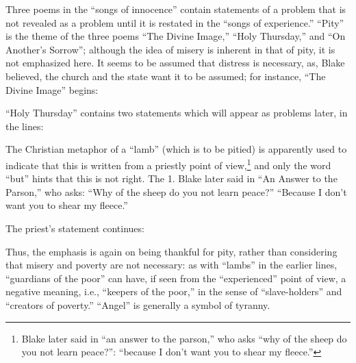 Three poems in the \enquote{songs of innocence} contain statements of a problem that is not revealed as a problem until
it is restated in the \enquote{songs of experience.} \enquote{Pity} is the theme of the three poems \enquote{The Divine Image,} \enquote{Holy Thursday,} and
\enquote{On Another's Sorrow}; although the idea of misery is inherent in that of pity, it is not emphasized here. It seems to be assumed that
distress is necessary, as, Blake believed, the church and the state want it to be assumed; for instance, \enquote{The Divine Image} begins:


\enquote{Holy Thursday} contains two statements which will appear as problems later, in the lines:


The Christian metaphor of a \enquote{lamb} (which is to be pitied) is apparently used
to indicate that this is written from a priestly point of view,\footnote{Blake later said in \enquote{an answer to the parson,} who asks \enquote{why of the sheep do you not learn peace?}: \enquote{because I don't want you to shear my fleece.}}
and only the word \enquote{but} hints that this is not right. The
1. Blake later said in \enquote{An Answer to the Parson,} who asks: \enquote{Why of the sheep do you not learn peace?} \enquote{Because I don't want
you to shear my fleece.}

\noindent The priest's statement continues:


Thus, the emphasis is again on being thankful for pity, rather than considering that misery and poverty are not
necessary: as with \enquote{lambs} in the earlier lines, \enquote{guardians of the poor} can have,
if seen from the \enquote{experienced} point of view, a negative meaning, i.e., \enquote{keepers of the poor,}
in the sense of \enquote{slave-holders} and \enquote{creators of poverty.} \enquote{Angel} is generally a symbol of tyranny.

